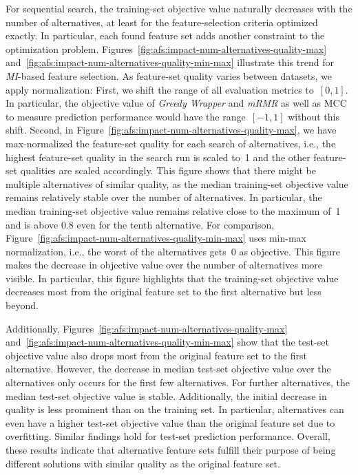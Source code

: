 \documentclass{article}
\theoremstyle{definition}
\begin{document}
For sequential search, the training-set objective value naturally decreases with the number of alternatives, at least for the feature-selection criteria optimized exactly.
In particular, each found feature set adds another constraint to the optimization problem.
Figures~\ref{fig:afs:impact-num-alternatives-quality-max} and~\ref{fig:afs:impact-num-alternatives-quality-min-max} illustrate this trend for \emph{MI}-based feature selection.
As feature-set quality varies between datasets, we apply normalization:
First, we shift the range of all evaluation metrics to~$[0,1]$.
In particular, the objective value of \emph{Greedy Wrapper} and \emph{mRMR} as well as MCC to measure prediction performance would have the range~$[-1,1]$ without this shift.
Second, in Figure~\ref{fig:afs:impact-num-alternatives-quality-max}, we have max-normalized the feature-set quality for each search of alternatives, i.e., the highest feature-set quality in the search run is scaled to~1 and the other feature-set qualities are scaled accordingly.
This figure shows that there might be multiple alternatives of similar quality, as the median training-set objective value remains relatively stable over the number of alternatives.
In particular, the median training-set objective value remains relative close to the maximum of~1 and is above 0.8 even for the tenth alternative.
For comparison, Figure~\ref{fig:afs:impact-num-alternatives-quality-min-max} uses min-max normalization, i.e., the worst of the alternatives gets~0 as objective.
This figure makes the decrease in objective value over the number of alternatives more visible.
In particular, this figure highlights that the training-set objective value decreases most from the original feature set to the first alternative but less beyond.

Additionally, Figures~\ref{fig:afs:impact-num-alternatives-quality-max} and~\ref{fig:afs:impact-num-alternatives-quality-min-max} show that the test-set objective value also drops most from the original feature set to the first alternative.
However, the decrease in median test-set objective value over the alternatives only occurs for the first few alternatives.
For further alternatives, the median test-set objective value is stable.
Additionally, the initial decrease in quality is less prominent than on the training set.
In particular, alternatives can even have a higher test-set objective value than the original feature set due to overfitting.
Similar findings hold for test-set prediction performance.
Overall, these results indicate that alternative feature sets fulfill their purpose of being different solutions with similar quality as the original feature set.
\end{document}
